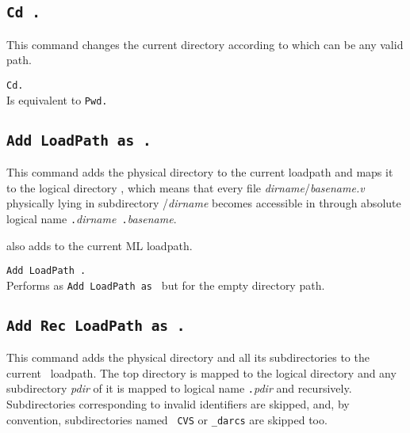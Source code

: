 \subsection[\tt Cd {\str}.]{\tt Cd {\str}.}
This command changes the current directory according to {\str} 
which can be any valid path.

\begin{Variants}
\item {\tt Cd.}\\
  Is equivalent to {\tt Pwd.}
\end{Variants}

\subsection[\tt Add LoadPath {\str} as {\dirpath}.]{\tt Add LoadPath {\str} as {\dirpath}.\label{AddLoadPath}}

This command adds the physical directory {\str} to the current {\Coq}
loadpath and maps it to the logical directory {\dirpath}, which means
that every file \textrm{\textsl{dirname}}/\textrm{\textsl{basename.v}}
physically lying in subdirectory {\str}/\textrm{\textsl{dirname}}
becomes accessible in {\Coq} through absolute logical name
{\dirpath}{\tt .}\textrm{\textsl{dirname}}{\tt
.}\textrm{\textsl{basename}}.

 also adds {\str} to the current ML loadpath.

\begin{Variants}
\item {\tt Add LoadPath {\str}.}\\
Performs as {\tt Add LoadPath {\str} as {\dirpath}} but for the empty directory path.
\end{Variants}

\subsection[\tt Add Rec LoadPath {\str} as {\dirpath}.]{\tt Add Rec LoadPath {\str} as {\dirpath}.\label{AddRecLoadPath}}
This command adds the physical directory {\str} and all its subdirectories to
the current \Coq\ loadpath. The top directory {\str} is mapped to the
logical directory {\dirpath} and any subdirectory {\textsl{pdir}} of it is
mapped to logical name {\dirpath}{\tt .}\textsl{pdir} and
recursively. Subdirectories corresponding to invalid {\Coq}
identifiers are skipped, and, by convention, subdirectories named {\tt
CVS} or {\tt \_darcs} are skipped too.


